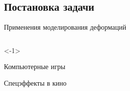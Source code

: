 \documentclass[usenames,dvipsnames,pdftex,unicode,hidelinks]{beamer}
\begin{document}
  \subsection{Постановка задачи} %
  \begin{frame}{Применения моделирования деформаций}
    \vspace{-2\baselineskip}
    \begin{columns}[c]
      \begin{column}{0.5\textwidth}<-1>
        \begin{center}
          Компьютерные игры

          Спецэффекты в кино


\end{center}
\end{column}
\end{columns}
\end{frame}
\end{document}
